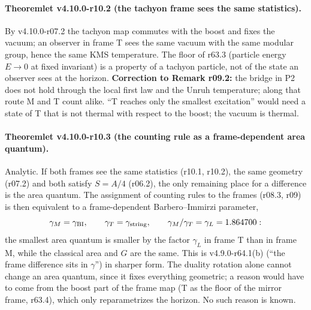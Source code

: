\paragraph{Theoremlet v4.10.0-r10.2 (the tachyon frame sees the same statistics).}
By v4.10.0-r07.2 the tachyon map commutes with the boost and fixes the vacuum; an observer in frame T sees the same vacuum with the same modular group,
hence the same KMS temperature.  The floor of r63.3 (particle energy \(E\to0\) at fixed invariant) is a property of a tachyon particle, not of the state an
observer sees at the horizon.  \textbf{Correction to Remark r09.2:} the bridge in P2 does not hold through the local first law and the Unruh temperature;
along that route M and T count alike.  ``T reaches only the smallest excitation'' would need a state of T that is not thermal with respect to the boost;
the vacuum is thermal.

\paragraph{Theoremlet v4.10.0-r10.3 (the counting rule as a frame-dependent area quantum).}
Analytic.  If both frames see the same statistics (r10.1, r10.2), the same geometry (r07.2) and both satisfy \(S=A/4\) (r06.2), the only remaining place for a
difference is the area quantum.  The assignment of counting rules to the frames (r08.3, r09) is then equivalent to a frame-dependent Barbero--Immirzi
parameter,
\[
\gamma_M=\gamma_{\rm BI},\qquad \gamma_T=\gamma_{\rm string},\qquad \gamma_M/\gamma_T=\gamma_L=1.864700:
\]
the smallest area quantum is smaller by the factor \(\gamma_L\) in frame T than in frame M, while the classical area and \(G\) are the same.  This is
v4.9.0-r64.1(b) (``the frame difference sits in \(\gamma\)'') in sharper form.  The duality rotation alone cannot change an area quantum, since it fixes
everything geometric; a reason would have to come from the boost part of the frame map (T as the floor of the mirror frame, r63.4), which only
reparametrizes the horizon.  No such reason is known.

